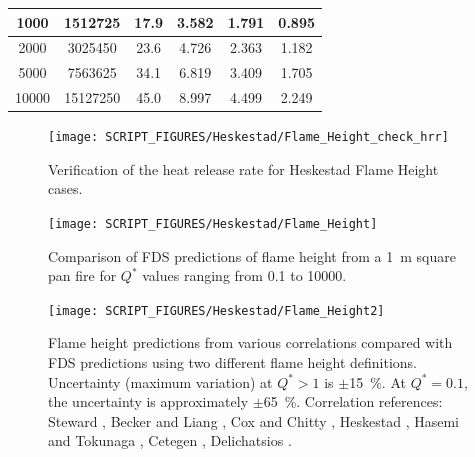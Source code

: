 \begin{table}[h!]
\begin{center}
\begin{tabular}{|c|c|c|c|c|c|}
1000        &   1512725      & 17.9       & 3.582        & 1.791       &  0.895     \\ \hline
2000        &   3025450      & 23.6       & 4.726        & 2.363       &  1.182     \\ \hline
5000        &   7563625      & 34.1       & 6.819        & 3.409       &  1.705     \\ \hline
10000       &   15127250     & 45.0       & 8.997        & 4.499       &  2.249     \\ \hline
\end{tabular}
\end{center}
\label{Flame_Height_Parameters}
\end{table}

\begin{figure}[h!]
\begin{center}
\texttt{[image: SCRIPT\_FIGURES/Heskestad/Flame\_Height\_check\_hrr]}
\end{center}
\caption[Verification of the heat release rate for Heskestad Flame Height cases]
{Verification of the heat release rate for Heskestad Flame Height cases.}
\label{Flame_Height_check_hrr}
\end{figure}

\clearpage

\begin{figure}[h!]
\begin{center}
\texttt{[image: SCRIPT\_FIGURES/Heskestad/Flame\_Height]}
\end{center}
\caption[Summary of flame height predictions, Heskestad correlation]
{Comparison of FDS predictions of flame height from a 1~m square pan fire for $Q^*$ values ranging from
0.1 to 10000.}
\label{Flame_Height}
\end{figure}

\begin{figure}[h!]
\texttt{[image: SCRIPT\_FIGURES/Heskestad/Flame\_Height2]}
\caption[Flame height uncertainty, multiple correlations and flame height definitions]
{Flame height predictions from various correlations compared with FDS predictions using two different flame height definitions.  Uncertainty (maximum variation) at $Q^*>1$ is $\pm$15~\%.  At $Q^*=0.1$, the uncertainty is approximately $\pm$65~\%. Correlation references: Steward \cite{Steward:1970}, Becker and Liang \cite{Becker:1978}, Cox and Chitty \cite{Cox:1985}, Heskestad \cite{SFPE:Heskestad}, Hasemi and Tokunaga \cite{Hasemi:1984}, Cetegen \cite{Cetegen:1984}, Delichatsios \cite{Delichatsios:1984}.}
\label{Flame_Height2}
\end{figure}



